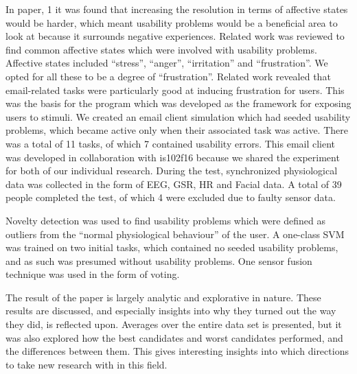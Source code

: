 In paper, 1 it was found that increasing the resolution in terms of affective states would be harder, which meant usability problems would be a beneficial area to look at because it surrounds negative experiences.
Related work was reviewed to find common affective states which were involved with usability problems.
Affective states included ``stress'', ``anger'', ``irritation'' and ``frustration''.
We opted for all these to be a degree of ``frustration''.
Related work revealed that email-related tasks were particularly good at inducing frustration for users\cite{frustration_with_computers}.
This was the basis for the program which was developed as the framework for exposing users to stimuli. 
We created an email client simulation which had seeded usability problems, which became active only when their associated task was active.
There was a total of 11 tasks, of which 7 contained usability errors.
This email client was developed in collaboration with is102f16 because we shared the experiment for both of our individual research.
During the test, synchronized physiological data was collected in the form of EEG, GSR, HR and Facial data.
A total of 39 people completed the test, of which 4 were excluded due to faulty sensor data.

Novelty detection was used to find usability problems which were defined as outliers from the ``normal physiological behaviour'' of the user. 
A one-class SVM was trained on two initial tasks, which contained no seeded usability problems, and as such was presumed without usability problems.
One sensor fusion technique was used in the form of voting. 

The result of the paper is largely analytic and explorative in nature.
These results are discussed, and especially insights into why they turned out the way they did, is reflected upon.
Averages over the entire data set is presented, but it was also explored how the best candidates and worst candidates performed, and the differences between them.
This gives interesting insights into which directions to take new research with in this field.


